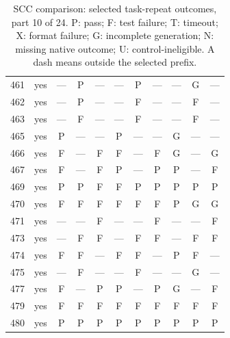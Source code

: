 \begin{table}[p]
\begin{tabular*}{\textwidth}{@{\extracolsep{\fill}}rc*{9}{c}@{}}
461 & yes & — & P & — & — & P & — & — & G & —\\
462 & yes & — & P & — & — & F & — & — & F & —\\
463 & yes & — & F & — & — & F & — & — & F & —\\
465 & yes & P & — & — & P & — & — & G & — & —\\
466 & yes & F & — & F & F & — & F & G & — & G\\
467 & yes & F & — & F & P & — & P & P & — & F\\
469 & yes & P & P & F & F & P & P & P & P & P\\
470 & yes & F & F & F & F & F & F & P & G & G\\
471 & yes & — & — & F & — & — & F & — & — & F\\
473 & yes & — & F & F & — & F & F & — & F & F\\
474 & yes & F & F & — & F & F & — & P & F & —\\
475 & yes & — & F & — & — & F & — & — & G & —\\
477 & yes & F & — & P & P & — & P & G & — & F\\
479 & yes & F & F & F & F & F & F & F & F & F\\
480 & yes & P & P & P & P & P & P & P & P & P\\
\bottomrule\end{tabular*}
\caption{SCC comparison: selected task-repeat outcomes, part 10 of 24. P: pass; F: test failure; T: timeout; X: format failure; G: incomplete generation; N: missing native outcome; U: control-ineligible. A dash means outside the selected prefix.}
\end{table}
\clearpage
